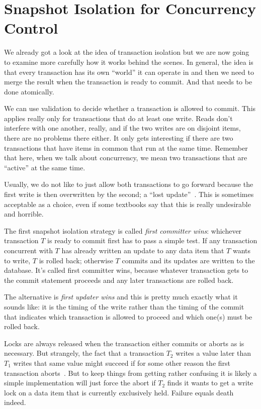 




\section*{Snapshot Isolation for Concurrency Control}

We already got a look at the idea of transaction isolation but we are now going to examine more carefully how it works behind the scenes. In general, the idea is that every transaction has its own ``world'' it can operate in and then we need to merge the result when the transaction is ready to commit. And that needs to be done atomically.

We can use validation to decide whether a transaction is allowed to commit. This applies really only for transactions that do at least one write. Reads don't interfere with one another, really, and if the two writes are on disjoint items, there are no problems there either. It only gets interesting if there are two transactions that have items in common that run at the same time. Remember that here, when we talk about concurrency, we mean two transactions that are ``active'' at the same time.

Usually, we do not like to just allow both transactions to go forward because the first write is then overwritten by the second; a ``lost update''~\cite{dsc}. This is sometimes  acceptable as a choice, even if some textbooks say that this is really undesirable and horrible.

The first snapshot isolation strategy is called \textit{first committer wins}: whichever transaction $T$ is ready to commit first has to pass a simple test. If any transaction concurrent with $T$ has already written an update to any data item that $T$ wants to write, $T$ is rolled back; otherwise $T$ commits and its updates are written to the database. It's called first committer wins, because whatever transaction gets to the commit statement proceeds and any later transactions are rolled back.

The alternative is \textit{first updater wins} and this is pretty much exactly what it sounds like: it is the timing of the write rather than the timing of the commit that indicates which transaction is allowed to proceed and which one(s) must be rolled back.  

Locks are always released when the transaction either commits or aborts as is necessary. But strangely, the fact that a transaction $T_{2}$ writes a value later than $T_{1}$ writes that same value might succeed if for some other reason the first transaction aborts~\cite{dsc}. But to keep things from getting rather confusing it is likely a simple implementation will just force the abort if $T_{2}$ finds it wants to get a write lock on a data item that is currently exclusively held. Failure equals death indeed.

